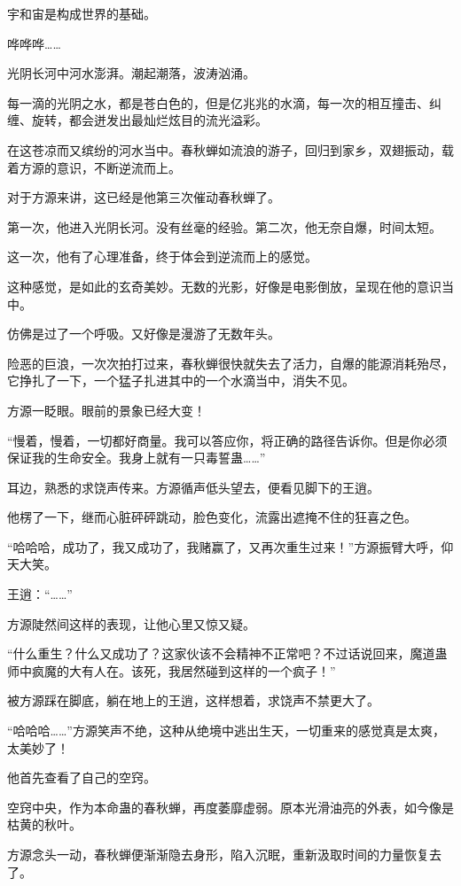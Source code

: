 \begin{this_body}
宇和宙是构成世界的基础。

哗哗哗……

光阴长河中河水澎湃。潮起潮落，波涛汹涌。

每一滴的光阴之水，都是苍白色的，但是亿兆兆的水滴，每一次的相互撞击、纠缠、旋转，都会迸发出最灿烂炫目的流光溢彩。

在这苍凉而又缤纷的河水当中。春秋蝉如流浪的游子，回归到家乡，双翅振动，载着方源的意识，不断逆流而上。

对于方源来讲，这已经是他第三次催动春秋蝉了。

第一次，他进入光阴长河。没有丝毫的经验。第二次，他无奈自爆，时间太短。

这一次，他有了心理准备，终于体会到逆流而上的感觉。

这种感觉，是如此的玄奇美妙。无数的光影，好像是电影倒放，呈现在他的意识当中。

仿佛是过了一个呼吸。又好像是漫游了无数年头。

险恶的巨浪，一次次拍打过来，春秋蝉很快就失去了活力，自爆的能源消耗殆尽，它挣扎了一下，一个猛子扎进其中的一个水滴当中，消失不见。

方源一眨眼。眼前的景象已经大变！

“慢着，慢着，一切都好商量。我可以答应你，将正确的路径告诉你。但是你必须保证我的生命安全。我身上就有一只毒誓蛊……”

耳边，熟悉的求饶声传来。方源循声低头望去，便看见脚下的王逍。

他楞了一下，继而心脏砰砰跳动，脸色变化，流露出遮掩不住的狂喜之色。

“哈哈哈，成功了，我又成功了，我赌赢了，又再次重生过来！”方源振臂大呼，仰天大笑。

王逍：“……”

方源陡然间这样的表现，让他心里又惊又疑。

“什么重生？什么又成功了？这家伙该不会精神不正常吧？不过话说回来，魔道蛊师中疯魔的大有人在。该死，我居然碰到这样的一个疯子！”

被方源踩在脚底，躺在地上的王逍，这样想着，求饶声不禁更大了。

“哈哈哈……”方源笑声不绝，这种从绝境中逃出生天，一切重来的感觉真是太爽，太美妙了！

他首先查看了自己的空窍。

空窍中央，作为本命蛊的春秋蝉，再度萎靡虚弱。原本光滑油亮的外表，如今像是枯黄的秋叶。

方源念头一动，春秋蝉便渐渐隐去身形，陷入沉眠，重新汲取时间的力量恢复去了。


\end{this_body}
